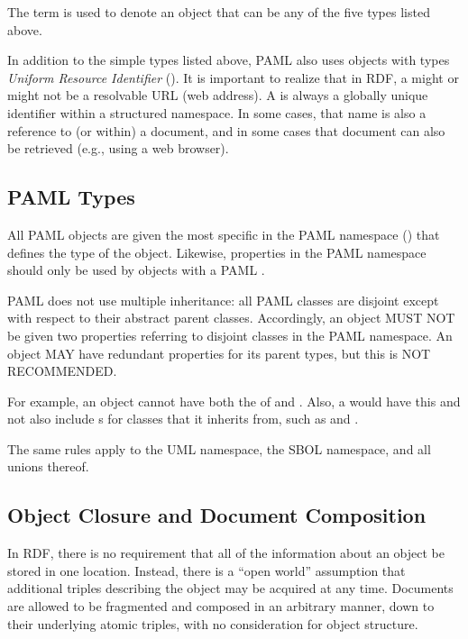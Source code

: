 The term  is used to denote an object that can be any of the five types listed above.

In addition to the simple types listed above, PAML also uses objects with types \emph{Uniform Resource Identifier} (). It is important to realize that in RDF, a  might or might not be a resolvable URL (web address).  A  is always a globally unique identifier within a structured namespace.  In some cases, that name is also a reference to (or within) a document, and in some cases that document can also be retrieved (e.g., using a web browser).


\subsection{PAML Types}
\label{sec:pamlTypes}

All PAML objects are given the most specific  in the PAML namespace () that defines the type of the object.  
Likewise, properties in the PAML namespace should only be used by objects with a PAML .

PAML does not use multiple inheritance: all PAML classes are disjoint except with respect to their abstract parent classes.
Accordingly, an object MUST NOT be given two  properties referring to disjoint classes in the PAML namespace.
An object MAY have redundant  properties for its parent types, but this is NOT RECOMMENDED.

For example, an object cannot have both the  of  and .  Also, a  would have this  and not also include s for classes that it inherits from, such as  and .

The same rules apply to the UML namespace, the SBOL namespace, and all unions thereof.


\subsection{Object Closure and Document Composition}

In RDF, there is no requirement that all of the information about an object be stored in one location.  
Instead, there is a ``open world'' assumption that additional triples describing the object may be acquired at any time.
Documents are allowed to be fragmented and composed in an arbitrary manner, down to their underlying atomic triples, with no consideration for object structure.

